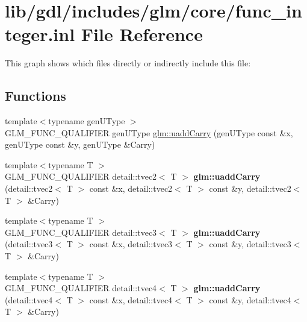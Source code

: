 \hypertarget{func__integer_8inl}{}\section{lib/gdl/includes/glm/core/func\+\_\+integer.inl File Reference}
\label{func__integer_8inl}
This graph shows which files directly or indirectly include this file\+:
\subsection*{Functions}
\begin{DoxyCompactItemize}
\item 
{\footnotesize template$<$typename gen\+U\+Type $>$ }\\G\+L\+M\+\_\+\+F\+U\+N\+C\+\_\+\+Q\+U\+A\+L\+I\+F\+I\+E\+R gen\+U\+Type \hyperlink{group__core__func__integer_ga19276bb7adbe9f0d74515ae49e40b481}{glm\+::uadd\+Carry} (gen\+U\+Type const \&x, gen\+U\+Type const \&y, gen\+U\+Type \&Carry)
\item 
\hypertarget{namespaceglm_a87a1c2105448723bbd560ea9157da7f7}{}{\footnotesize template$<$typename T $>$ }\\G\+L\+M\+\_\+\+F\+U\+N\+C\+\_\+\+Q\+U\+A\+L\+I\+F\+I\+E\+R detail\+::tvec2$<$ T $>$ {\bfseries glm\+::uadd\+Carry} (detail\+::tvec2$<$ T $>$ const \&x, detail\+::tvec2$<$ T $>$ const \&y, detail\+::tvec2$<$ T $>$ \&Carry)\label{namespaceglm_a87a1c2105448723bbd560ea9157da7f7}

\item 
\hypertarget{namespaceglm_a7b00aba4f9826a78a4bcdd7a9aef5b7f}{}{\footnotesize template$<$typename T $>$ }\\G\+L\+M\+\_\+\+F\+U\+N\+C\+\_\+\+Q\+U\+A\+L\+I\+F\+I\+E\+R detail\+::tvec3$<$ T $>$ {\bfseries glm\+::uadd\+Carry} (detail\+::tvec3$<$ T $>$ const \&x, detail\+::tvec3$<$ T $>$ const \&y, detail\+::tvec3$<$ T $>$ \&Carry)\label{namespaceglm_a7b00aba4f9826a78a4bcdd7a9aef5b7f}

\item 
\hypertarget{namespaceglm_a23d2f491392fa08223abc23ec758d2d5}{}{\footnotesize template$<$typename T $>$ }\\G\+L\+M\+\_\+\+F\+U\+N\+C\+\_\+\+Q\+U\+A\+L\+I\+F\+I\+E\+R detail\+::tvec4$<$ T $>$ {\bfseries glm\+::uadd\+Carry} (detail\+::tvec4$<$ T $>$ const \&x, detail\+::tvec4$<$ T $>$ const \&y, detail\+::tvec4$<$ T $>$ \&Carry)\label{namespaceglm_a23d2f491392fa08223abc23ec758d2d5}


\end{DoxyCompactItemize}
